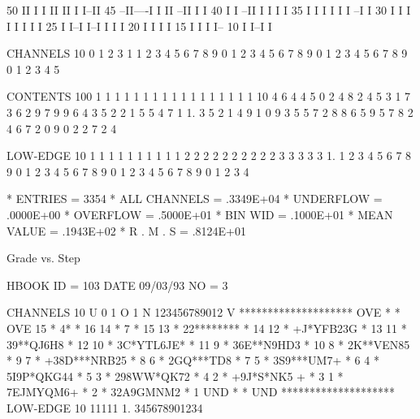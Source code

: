 \begin{Listing}
       50         II    I  I    II    II    I                                  I--II
       45       --II----I  I    II  --II    I                                      I
       40       I          I  --II  I  I    I                                      I
       35       I          I  I  I  I  I  --I                                      I
       30       I          I  I  I  I  I  I                                        I
       25       I          I--I  I--I  I  I                                        I
       20       I                      I  I                                        I
       15       I                      I  I                                        I--
       10       I                      I--I                                          I
 
 CHANNELS  10    0                 1                   2                   3             
            1    1 2 3 4 5 6 7 8 9 0 1 2 3 4 5 6 7 8 9 0 1 2 3 4 5 6 7 8 9 0 1 2 3 4 5   
 
 CONTENTS 100              1                 1 1 1 1 1 1 1 1 1 1 1 1 1 1 1 1          
           10    4 6 4 4 5 0 2 4 8 2 4 5   3 1 7 3 6 2 9 7 9 9 6 4 3 5 2 2 1 5 5 4 7 1
            1.   3 5 2 1 4 9 1 0 9 3 5 5 7 2 8 8 6 5 9 5 7 8 2 4 6 7 2 0 9 0 2 2 7 2 4
 
 LOW-EDGE  10                       1 1 1 1 1 1 1 1 1 1 2 2 2 2 2 2 2 2 2 2 3 3 3 3 3 
            1.    1 2 3 4 5 6 7 8 9 0 1 2 3 4 5 6 7 8 9 0 1 2 3 4 5 6 7 8 9 0 1 2 3 4 
 
 * ENTRIES =       3354      * ALL CHANNELS =  .3349E+04      * UNDERFLOW =  .0000E+00      * OVERFLOW =  .5000E+01
 * BIN WID =  .1000E+01      * MEAN VALUE   =  .1943E+02      * R . M . S =  .8124E+01

 Grade vs. Step                                                                  
 
 HBOOK     ID =       103                                        DATE  09/03/93              NO =     3
 
 CHANNELS  10 U 0        1   O 
            1 N 123456789012 V 
            ********************
   OVE      *                  * OVE
    15      *   4*             *  16
    14      *    7             *  15
    13      *   22********     *  14
    12      *    +J*YFB23G     *  13
    11      *    39**QJ6H8     *  12
    10      *    3C*YTL6JE*    *  11
     9      *    36E**N9HD3    *  10
     8      *     2K**VEN85    *   9
     7      *   +38D***NRB25   *   8
     6      *    2GQ***TD8     *   7
     5      *    3S9***UM7+    *   6
     4      *    5I9P*QKG44    *   5
     3      *    298WW*QK72    *   4
     2      *    +9J*S*NK5 +   *   3
     1      *     7EJMYQM6+    *   2
            *    32A9GMNM2     *   1
   UND      *                  * UND
            ********************
 LOW-EDGE  10          11111
            1.  345678901234
 

\end{Listing}
